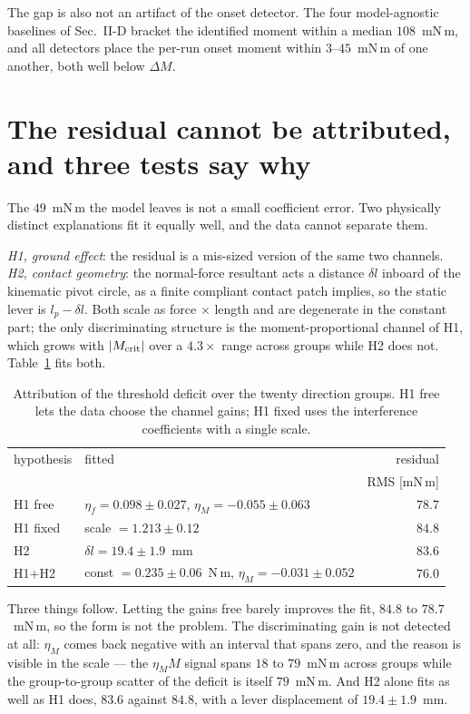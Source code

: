 \documentclass[10pt]{article}
\begin{document}
The gap is also not an artifact of the onset detector. The four
model-agnostic baselines of Sec.~II-D bracket the identified moment
within a median $108$~mN\,m, and all detectors place the per-run onset
moment within $3$--$45$~mN\,m of one another, both well below
$\Delta M$.

\section*{The residual cannot be attributed, and three tests say why}

The $49$~mN\,m the model leaves is not a small coefficient error. Two
physically distinct explanations fit it equally well, and the data
cannot separate them.

\emph{H1, ground effect}: the residual is a mis-sized version of the
same two channels. \emph{H2, contact geometry}: the normal-force
resultant acts a distance $\delta l$ inboard of the kinematic pivot
circle, as a finite compliant contact patch implies, so the static
lever is $l_p - \delta l$. Both scale as force $\times$ length and are
degenerate in the constant part; the only discriminating structure is
the moment-proportional channel of H1, which grows with $|M_{\rm crit}|$
over a $4.3\times$ range across groups while H2 does not.
Table~\ref{tab:attrib} fits both.

\begin{table}[t]
\centering
\caption{Attribution of the threshold deficit over the twenty direction
groups. H1 free lets the data choose the channel gains; H1 fixed uses
the interference coefficients with a single scale.}
\label{tab:attrib}
\small
\setlength{\tabcolsep}{4pt}
\begin{tabular}{@{}l l r@{}}
\hline
hypothesis & fitted & residual \\
 & & RMS [mN\,m] \\
\hline
H1 free       & $\eta_f = 0.098\pm0.027$, $\eta_M = -0.055\pm0.063$ & $78.7$\\
H1 fixed      & scale $= 1.213\pm0.12$                              & $84.8$\\
H2            & $\delta l = 19.4\pm1.9$~mm                          & $83.6$\\
H1$+$H2       & const $= 0.235\pm0.06$~N\,m, $\eta_M = -0.031\pm0.052$ & $76.0$\\
\hline
\end{tabular}
\end{table}

Three things follow. Letting the gains free barely improves the fit,
$84.8$ to $78.7$~mN\,m, so the form is not the problem. The
discriminating gain is not detected at all: $\eta_M$ comes back
negative with an interval that spans zero, and the reason is visible in
the scale --- the $\eta_M M$ signal spans $18$ to $79$~mN\,m across
groups while the group-to-group scatter of the deficit is itself
$79$~mN\,m. And H2 alone fits as well as H1 does, $83.6$ against
$84.8$, with a lever displacement of $19.4\pm1.9$~mm.
\end{document}

